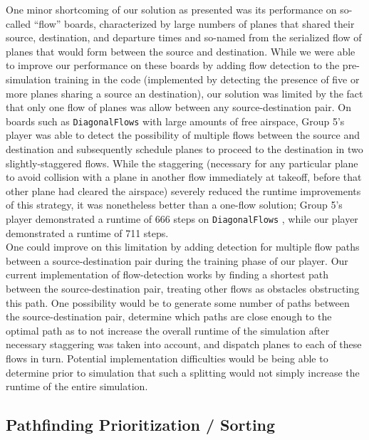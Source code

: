 \documentclass[10pt]{article}
\newcommand{\ms}[1] {
  \texttt{#1}
}
\begin{document}
One minor shortcoming of our solution as presented was its performance 
on so-called ``flow'' boards, characterized by large numbers  of planes that shared 
their source, destination, and departure times and so-named from the serialized 
flow of planes that would form between the source and destination.  While we
were able to improve our performance on these boards by adding flow detection
to the pre-simulation training in the code (implemented by detecting the presence
of five or more planes sharing a source an destination), our solution was limited
by the fact that only one flow of planes was allow between any source-destination
pair. On boards such as \ms{DiagonalFlows} with large amounts of free airspace, Group 5's
player was able to detect the possibility of multiple flows between the source and destination
and subsequently schedule planes to proceed to the destination in two slightly-staggered
flows. While the staggering (necessary for any particular plane to avoid collision with
a plane in another flow immediately at takeoff, before that other plane had cleared the 
airspace) severely reduced the runtime improvements of this strategy, it was nonetheless
better than a one-flow solution; Group 5's player demonstrated a runtime of 666 steps
on \ms{DiagonalFlows}, while our player demonstrated a runtime of 711 steps.\\

One could improve on this limitation by adding detection for multiple flow paths between
a source-destination pair during the training phase of our player. Our current implementation
of flow-detection works by finding a shortest path between the source-destination pair, treating
other flows as obstacles obstructing this path. One possibility would be to generate some number
of paths between the source-destination pair, determine which paths are close enough to the
optimal path as to not increase the overall runtime of the simulation after necessary 
staggering was taken into account, and dispatch planes to each of these flows in turn.
Potential implementation difficulties would be being able to determine prior to simulation
that such a splitting would not simply increase the runtime of the entire simulation.

\subsection{Pathfinding Prioritization / Sorting}
\end{document}
